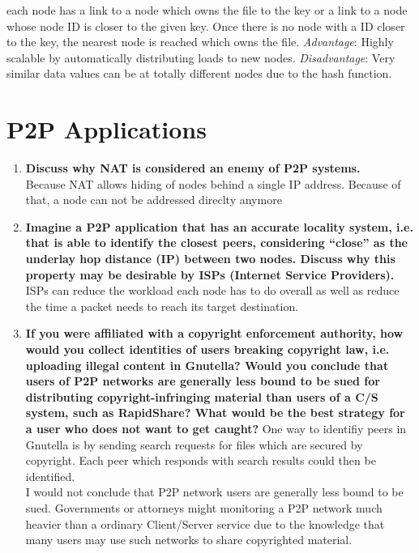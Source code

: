 \documentclass{article}
\begin{document}
\begin{enumerate}[1]
\begin{itemize}
                  each node has a link to a node which owns the file to the key or a link to a node whose node ID is closer to the given key. Once there is no node with 
                  a ID closer to the key, the nearest node is reached which owns the file.
                  \textit{Advantage}: Highly scalable by automatically distributing loads to new nodes.
                  \textit{Disadvantage}: Very similar data values can be at totally different nodes due to the hash function.
          \end{itemize}
  \end{enumerate}

\section{P2P Applications}
  \begin{enumerate}[1]
    \item \textbf{Discuss why NAT is considered an enemy of P2P systems.} \\
          Because NAT allows hiding of nodes behind a single IP address. Because of that, a node can not be addressed direclty anymore
    \item \textbf{Imagine a P2P application that has an accurate locality system, i.e. that is able to identify the closest peers, considering “close” as the underlay hop distance (IP) between two nodes. Discuss why this property may be desirable by ISPs (Internet Service Providers).} \\
          ISPs can reduce the workload each node has to do overall as well as reduce the time a packet needs to reach its target destination.
    \item \textbf{If you were affiliated with a copyright enforcement authority, how would you collect identities of users breaking copyright law, i.e. uploading illegal content in Gnutella? Would you conclude that users of P2P networks are generally less bound to be sued for distributing copyright-infringing material than users of a C/S system, such as RapidShare? What would be the best strategy for a user who does not want to get caught?}
          One way to identifiy peers in Gnutella is by sending search requests for files which are secured by copyright. Each peer which responds with search 
          results could then be identified. \\
          I would not conclude that P2P network users are generally less bound to be sued. Governments or attorneys might monitoring a P2P network 
          much heavier than a ordinary Client/Server service due to the knowledge that many users may use such networks to share copyrighted material.

\end{enumerate}
\end{document}
